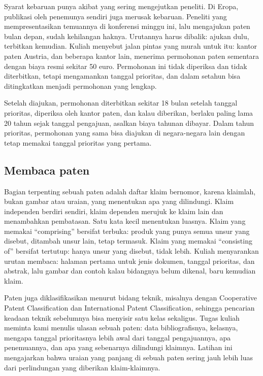Syarat kebaruan punya akibat yang sering mengejutkan peneliti. Di Eropa, publikasi oleh penemunya sendiri juga merusak kebaruan.
Peneliti yang mempresentasikan temuannya di konferensi minggu ini, lalu mengajukan paten bulan depan, sudah kehilangan haknya. Urutannya
harus dibalik: ajukan dulu, terbitkan kemudian. Kuliah menyebut jalan pintas yang murah untuk itu: kantor paten Austria, dan beberapa
kantor lain, menerima permohonan paten sementara dengan biaya resmi sekitar 50 euro. Permohonan ini tidak diperiksa dan tidak
diterbitkan, tetapi mengamankan tanggal prioritas, dan dalam setahun bisa ditingkatkan menjadi permohonan yang lengkap.

Setelah diajukan, permohonan diterbitkan sekitar 18 bulan setelah tanggal prioritas, diperiksa oleh kantor paten, dan kalau diberikan,
berlaku paling lama 20 tahun sejak tanggal pengajuan, asalkan biaya tahunan dibayar. Dalam tahun prioritas, permohonan yang sama bisa
diajukan di negara-negara lain dengan tetap memakai tanggal prioritas yang pertama.

\subsection{Membaca paten}

Bagian terpenting sebuah paten adalah daftar klaim bernomor, karena klaimlah, bukan gambar atau uraian, yang menentukan apa yang
dilindungi. Klaim independen berdiri sendiri, klaim dependen merujuk ke klaim lain dan menambahkan pembatasan. Satu kata kecil
menentukan luasnya. Klaim yang memakai ``comprising'' bersifat terbuka: produk yang punya semua unsur yang disebut, ditambah unsur
lain, tetap termasuk. Klaim yang memakai ``consisting of'' bersifat tertutup: hanya unsur yang disebut, tidak lebih. Kuliah
menyarankan urutan membaca: halaman pertama untuk jenis dokumen, tanggal prioritas, dan abstrak, lalu gambar dan contoh kalau
bidangnya belum dikenal, baru kemudian klaim.

Paten juga diklasifikasikan menurut bidang teknik, misalnya dengan Cooperative Patent Classification dan International Patent
Classification, sehingga pencarian keadaan teknik sebelumnya bisa menyisir satu kelas sekaligus. Tugas kuliah meminta kami menulis
ulasan sebuah paten: data bibliografisnya, kelasnya, mengapa tanggal prioritasnya lebih awal dari tanggal pengajuannya, apa
penemuannya, dan apa yang sebenarnya dilindungi klaimnya. Latihan ini mengajarkan bahwa uraian yang panjang di sebuah paten sering
jauh lebih luas dari perlindungan yang diberikan klaim-klaimnya.

